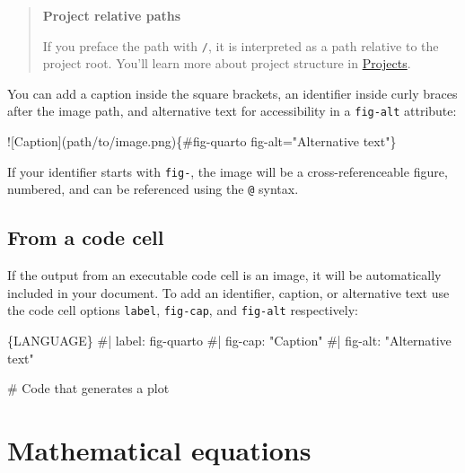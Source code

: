 \documentclass[
  letterpaper,
  DIV=11,
  numbers=noendperiod,
  oneside]{scrreprt}
\newenvironment{Shaded}{\begin{snugshade}}{\end{snugshade}}
\newcommand{\AlertTok}[1]{\textcolor[rgb]{0.68,0.00,0.00}{#1}}
\newcommand{\InformationTok}[1]{\textcolor[rgb]{0.37,0.37,0.37}{#1}}
\newcommand{\NormalTok}[1]{\textcolor[rgb]{0.00,0.23,0.31}{#1}}
\begin{document}
\begin{tcolorbox}
\begin{quote}
\textbf{Project relative paths}

If you preface the path with \texttt{/}, it is interpreted as a path
relative to the project root. You'll learn more about project structure
in \hyperref[sec-projects]{Projects}.
\end{quote}

You can add a caption inside the square brackets, an identifier inside
curly braces after the image path, and alternative text for
accessibility in a \texttt{fig-alt} attribute:

\begin{Shaded}
\begin{Highlighting}[]
\AlertTok{![Caption](path/to/image.png)}\NormalTok{\{\#fig{-}quarto fig{-}alt="Alternative text"\}}
\end{Highlighting}
\end{Shaded}

If your identifier starts with \texttt{fig-}, the image will be a
cross-referenceable figure, numbered, and can be referenced using the
\texttt{@} syntax.

\subsection{From a code cell}\label{sec-computational-figure}

If the output from an executable code cell is an image, it will be
automatically included in your document. To add an identifier, caption,
or alternative text use the code cell options \texttt{label},
\texttt{fig-cap}, and \texttt{fig-alt} respectively:

\begin{Shaded}
\begin{Highlighting}[]
\InformationTok{\textasciigrave{}\textasciigrave{}\textasciigrave{}\{LANGUAGE\}}
\InformationTok{\#| label: fig{-}quarto}
\InformationTok{\#| fig{-}cap: "Caption"}
\InformationTok{\#| fig{-}alt: "Alternative text"}

\InformationTok{\# Code that generates a plot}
\InformationTok{\textasciigrave{}\textasciigrave{}\textasciigrave{}}
\end{Highlighting}
\end{Shaded}

\section{Mathematical equations}\label{sec-equations}


\end{tcolorbox}
\end{document}
